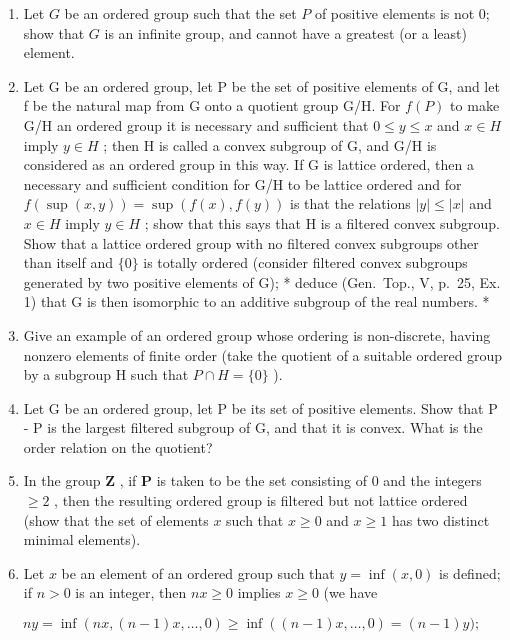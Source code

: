 \begin{enumerate}
\def\labelenumi{\arabic{enumi})}
\setcounter{enumi}{2}
\item
  Let \(G\) be an ordered group such that the set \(P\) of positive elements is not 0; show that \(G\) is an infinite group, and cannot have a greatest (or a least) element.
\item
  Let G be an ordered group, let P be the set of positive elements of G, and let f be the natural map from G onto a quotient group G/H. For \(f(P)\) to make G/H an ordered group it is necessary and sufficient that \(0 \leqslant y \leqslant x\) and \(x \in H\) imply \(y \in H\) ; then H is called a convex subgroup of G, and G/H is considered as an ordered group in this way. If G is lattice ordered, then a necessary and sufficient condition for G/H to be lattice ordered and for \(f(\sup(x, y)) = \sup(f(x), f(y))\) is that the relations \(|y| \leqslant |x|\) and \(x \in H\) imply \(y \in H\) ; show that this says that H is a filtered convex subgroup. Show that a lattice ordered group with no filtered convex subgroups other than itself and \(\{0\}\) is totally ordered (consider filtered convex subgroups generated by two positive elements of G); * deduce (Gen.~Top., V, p.~25, Ex. 1) that G is then isomorphic to an additive subgroup of the real numbers. *
\item
  Give an example of an ordered group whose ordering is non-discrete, having nonzero elements of finite order (take the quotient of a suitable ordered group by a subgroup H such that \(P \cap H = \{0\}\) ).
\item
  Let G be an ordered group, let P be its set of positive elements. Show that P - P is the largest filtered subgroup of G, and that it is convex. What is the order relation on the quotient?
\item
  In the group \(\mathbf{Z}\) , if \(\mathbf{P}\) is taken to be the set consisting of 0 and the integers \(\geqslant 2\) , then the resulting ordered group is filtered but not lattice ordered (show that the set of elements \(x\) such that \(x \geqslant 0\) and \(x \geqslant 1\) has two distinct minimal elements).
\item
  Let \(x\) be an element of an ordered group such that \(y = \inf(x, 0)\) is defined; if \(n > 0\) is an integer, then \(nx \geqslant 0\) implies \(x \geqslant 0\) (we have
\end{enumerate}

\[
n y = \inf (n x, (n - 1) x, \dots , 0) \geqslant \inf ((n - 1) x, \dots , 0) = (n - 1) y);
\]

